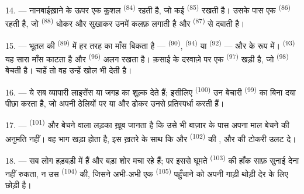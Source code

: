 14. --- नानबाईख़ाने के ऊपर एक कुशल  \textsuperscript{(84)}
रहती है, जो कई  \textsuperscript{(85)} रखती है। उसके
पास एक  \textsuperscript{(86)} रहती है, जो
 \textsuperscript{(88)} धोकर और सुखाकर उनमें कलफ़ लगाती है और
 \textsuperscript{(87)} से दबाती है।

\VUsaut{4.0mm}
\VUsaut{3.0mm}

15. --- भूतल की  \textsuperscript{(89)} में हर तरह का माँस
बिकता है —  \textsuperscript{(90)}, 
\textsuperscript{(94)} या  \textsuperscript{(92)} —  और  के रूप में। 
\textsuperscript{(93)} यह सारा माँस काटता है और 
\textsuperscript{(96)} अलग रखता है। क़साई के दरवाज़े पर एक
 \textsuperscript{(97)} खड़ी है, जो 
\textsuperscript{(98)} बेचती है। चाहें तो वह उन्हें खोल भी देती है।

16. --- ये सब व्यापारी लाइसेंस या जगह का शुल्क देते हैं; इसीलिए
 \textsuperscript{(100)} उन बेचारी 
\textsuperscript{(99)} का बिना दया पीछा करता है, जो अपनी ठेलियों पर
 या  और  ढोकर उनसे प्रतिस्पर्धा करती हैं।

\VUsaut{4.0mm}
\VUsaut{3.0mm}

17. ---  \textsuperscript{(101)} और  बेचने वाला लड़का
ख़ूब जानता है कि उसे भी बाज़ार के पास अपना माल बेचने की अनुमति नहीं। वह भाग खड़ा
होता है, इस ख़तरे के साथ कि  और 
 \textsuperscript{(102)} की ,
 और  की टोकरी उलट दे।

18. --- सब लोग हड़बड़ी में हैं और बड़ा शोर मचा रहे हैं; पर इससे घूमते
 \textsuperscript{(103)} की हाँक साफ़ सुनाई देना नहीं रुकता, न उस
 \textsuperscript{(104)} की, जिसने अभी-अभी एक
 \textsuperscript{(105)} पहुँचाने को अपनी गाड़ी थोड़ी देर के
लिए छोड़ी है।
\VUsaut{6.0mm}
\VUfilet{22mm}
